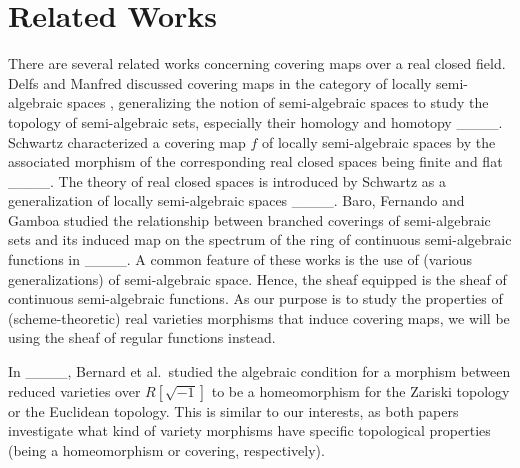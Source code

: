 \section{Related Works}
There are several related works concerning covering maps over a real closed field. Delfs and Manfred discussed covering maps in the category of locally semi-algebraic spaces \cite[Section 5]{delfs1984introduction}, generalizing the notion of semi-algebraic spaces to study the topology of semi-algebraic sets, especially their homology and homotopy ____. Schwartz characterized a covering map $f$ of locally semi-algebraic spaces by the associated morphism of the corresponding real closed spaces being finite and flat ____. The theory of real closed spaces is introduced by Schwartz as a generalization of locally semi-algebraic spaces ____. Baro, Fernando and Gamboa studied the relationship between branched coverings of semi-algebraic sets and its induced map on the spectrum of the ring of continuous semi-algebraic functions in ____. A common feature of these works is the use of (various generalizations) of semi-algebraic space. Hence, the sheaf equipped is the sheaf of continuous semi-algebraic functions. As our purpose is to study the properties of (scheme-theoretic) real varieties morphisms that induce covering maps, we will be using the sheaf of regular functions instead. %

	In ____, Bernard et al.\ studied the algebraic condition for a morphism between reduced varieties over $R[\sqrt{-1}]$ to be a homeomorphism for the Zariski topology or the Euclidean topology. This is similar to our interests, as both papers investigate what kind of variety morphisms have specific topological properties (being a homeomorphism or covering, respectively).